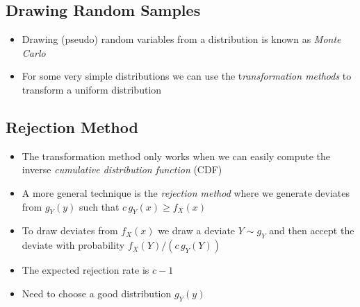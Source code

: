 \Outline %

\begin{slide}
\section[-2]{Drawing Random Samples}

\pb
\begin{itemize}
\item Drawing (pseudo) random variables from a distribution is known
  as \emph{Monte Carlo}\pauseh
\item For some very simple distributions we can use the t\emph{ransformation
  methods} to transform a uniform distribution\pauseh
\end{itemize}
\begin{center}
  \pause
\end{center}

\end{slide}


\begin{slide}
\section{Rejection Method}

\begin{PauseHighLight}
  \begin{itemize}
  \item The transformation method only works when we can easily compute
    the inverse \textit{cumulative distribution function} (CDF)\pause
  \item A more general technique is the \emph{rejection method} where we
    generate deviates from $g_Y(y)$ such that $c\,g_Y(x)\geq f_X(x)$\pause
  \item To draw deviates from $f_X(x)$ we draw a deviate $Y\sim g_Y$ and
    then accept the deviate with probability $f_X(Y)/(c\,g_Y(Y))$\pause
  \item The expected rejection rate is $c-1$\pause
  \item Need to choose a good distribution $g_Y(y)$\pause
  \end{itemize}
\end{PauseHighLight}

\end{slide}


